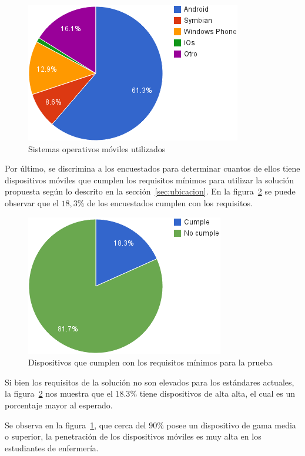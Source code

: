 \begin{figure}[H]
\centering
\includegraphics[scale=0.5]{resultados/imagenes/ubicacion_sistemas_operativos.png}
\caption{Sistemas operativos móviles utilizados}
\label{fig:ubicacion_sistemas_operativos}
\end{figure}

Por último, se discrimina a los encuestados para determinar cuantos de ellos
tiene dispositivos móviles que cumplen los requisitos mínimos para utilizar la
solución propuesta según lo descrito en la sección~\ref{sec:ubicacion}. En la
figura~\ref{fig:ubicacion_requisitos_minimos} se puede observar que el $18,3\%$
de los encuestados cumplen con los requisitos.

\begin{figure}[H]
\centering
\includegraphics[scale=0.5]{resultados/imagenes/ubicacion_requisitos_minimos.png}
\caption{Dispositivos que cumplen con los requisitos mínimos para la prueba}
\label{fig:ubicacion_requisitos_minimos}
\end{figure}

Si bien los requisitos de la solución no son elevados para los estándares
actuales, la figura~\ref{fig:ubicacion_requisitos_minimos} nos muestra que el
$18.3\%$ tiene dispositivos de alta alta, el cual es un porcentaje mayor al
esperado.

Se observa en la figura~\ref{fig:ubicacion_sistemas_operativos}, que cerca del
$90\%$ posee un dispositivo de gama media o superior, la penetración de los
dispositivos móviles es muy alta en los estudiantes de enfermería.
